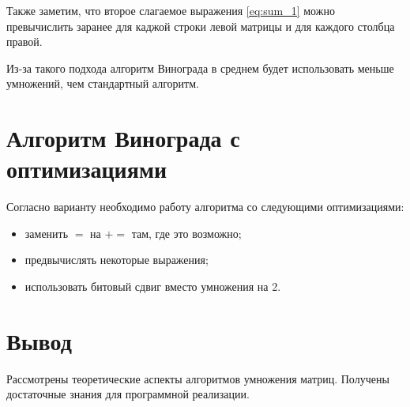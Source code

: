 Также заметим, что второе слагаемое выражения \ref{eq:sum_1} можно превычислить заранее для каджой строки левой матрицы и для каждого столбца правой.

Из-за такого подхода алгоритм Винограда в среднем будет использовать меньше умножений, чем стандартный алгоритм.

\section{Алгоритм Винограда с оптимизациями}

Согласно варианту необходимо работу алгоритма со следующими оптимизациями:
\begin{itemize}
	\item заменить $=$ на $+=$ там, где это возможно;
	\item предвычислять некоторые выражения;
	\item использовать битовый сдвиг вместо умножения на 2.
\end{itemize}



\section*{Вывод}

Рассмотрены теоретические аспекты алгоритмов умножения матриц. Получены достаточные знания для программной реализации.

\clearpage